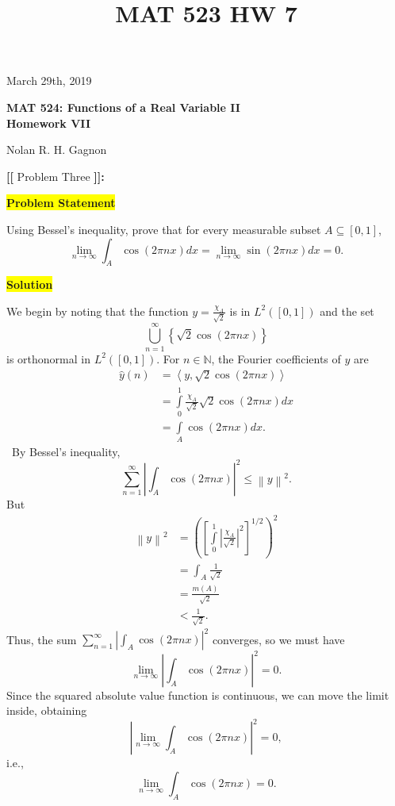 \documentclass[12pt]{article}
\title{MAT 523 HW 7}
\newcommand\norm[1]{\left\lVert#1\right\rVert}
\newcommand{\mybox}{%
    \collectbox{%
        \setlength{\fboxsep}{2pt}%
        \fbox{\BOXCONTENT}%
    }%
}
\begin{document}
\hfill March 29th, 2019
\begin{center}
\begin{large}
\textbf{MAT 524: Functions of a Real Variable II \\
\vspace{-5mm}
Homework VII \\}
\end{large}
\vspace{-2mm}
Nolan R. H. Gagnon \\
\end{center}
\vspace{-0.5cm}
\noindent \textbf{{\huge [}{\Large [}} Problem Three \textbf{{\Large ]}{\huge ]}}{\Large \textbf{:}}

\vspace{3mm}

\noindent\mybox{\colorbox{yellow}{\textbf{Problem Statement}}}\hspace{3mm}\hrulefill

\noindent Using Bessel's inequality, prove that for every measurable subset $A \subseteq [0,1]$,
$$
\lim\limits_{n\rightarrow\infty}\int_A \cos(2\pi n x) dx = \lim\limits_{n\rightarrow\infty} \sin(2\pi n x)dx = 0.
$$

\noindent\mybox{\colorbox{yellow}{\textbf{Solution}}}\hspace{3mm}\hrulefill

\noindent We begin by noting that the function $y = \frac{\chi_A}{\sqrt{2}}$ is in $L^2([0,1])$ and the set $$\bigcup\limits_{n=1}^{\infty}\left\lbrace \sqrt{2}\cos(2\pi n x)\right\rbrace$$ is orthonormal in $L^2([0,1])$. For $n\in\mathbb{N}$, the Fourier coefficients of $y$ are 
\begin{align}
\hat{y}(n) &= \left<y,\sqrt{2}\cos(2\pi n x)\right> \\
&= \int\limits_0^1 \frac{\chi_A}{\sqrt{2}} \sqrt{2}\cos(2\pi n x) dx \\
&= \int\limits_{A} \cos(2\pi n x) dx.
\end{align}\
By Bessel's inequality,
$$\sum\limits_{n=1}^{\infty} \left| \int_A \cos(2\pi n x) \right|^2 \leq \norm{y}^2.$$ But
\begin{align}
    \norm{y}^2 &= \left(\left[\int\limits_0^1 \left| \frac{\chi_A}{\sqrt{2}}\right|^2\right]^{1/2}\right)^2 \\
    &= \int_A \frac{1}{\sqrt{2}} \\
    &= \frac{m(A)}{\sqrt{2}} \\
    &< \frac{1}{\sqrt{2}}.
\end{align}
Thus, the sum $\sum\limits_{n=1}^{\infty} \left| \int_A \cos(2\pi n x) \right|^2$ converges, so we must have
$$\lim\limits_{n\rightarrow\infty} \left| \int_A \cos(2\pi n x) \right|^2 = 0.$$ Since the squared absolute value function is continuous, we can move the limit inside, obtaining
$$\left|\lim\limits_{n\rightarrow\infty} \int_A \cos(2\pi n x) \right|^2=0,$$ i.e.,
$$\lim\limits_{n\rightarrow\infty} \int_A \cos(2\pi n x) = 0.$$
\end{document}
